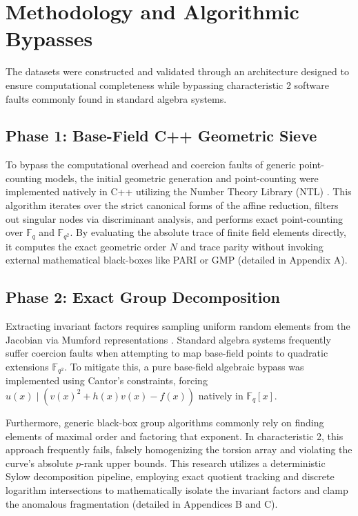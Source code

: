 \documentclass[11pt,letterpaper]{article}
\begin{document}
\section{Methodology and Algorithmic Bypasses}
The datasets were constructed and validated through an architecture designed to ensure computational completeness while bypassing characteristic 2 software faults commonly found in standard algebra systems. 

\subsection{Phase 1: Base-Field C++ Geometric Sieve}
To bypass the computational overhead and coercion faults of generic point-counting models, the initial geometric generation and point-counting were implemented natively in C++ utilizing the Number Theory Library (NTL) \cite{ShoupNTL}. This algorithm iterates over the strict canonical forms of the affine reduction, filters out singular nodes via discriminant analysis, and performs exact point-counting over $\mathbb{F}_q$ and $\mathbb{F}_{q^2}$. By evaluating the absolute trace of finite field elements directly, it computes the exact geometric order $N$ and trace parity without invoking external mathematical black-boxes like PARI or GMP (detailed in Appendix A).

\subsection{Phase 2: Exact Group Decomposition}
Extracting invariant factors requires sampling uniform random elements from the Jacobian via Mumford representations \cite{Cantor1987}. Standard algebra systems frequently suffer coercion faults when attempting to map base-field points to quadratic extensions $\mathbb{F}_{q^2}$. To mitigate this, a pure base-field algebraic bypass was implemented using Cantor's constraints, forcing $u(x) \mid \left( v(x)^2 + h(x)v(x) - f(x) \right)$ natively in $\mathbb{F}_q[x]$.

Furthermore, generic black-box group algorithms commonly rely on finding elements of maximal order and factoring that exponent. In characteristic 2, this approach frequently fails, falsely homogenizing the torsion array and violating the curve's absolute $p$-rank upper bounds. This research utilizes a deterministic Sylow decomposition pipeline, employing exact quotient tracking and discrete logarithm intersections to mathematically isolate the invariant factors and clamp the anomalous fragmentation (detailed in Appendices B and C).
\end{document}
